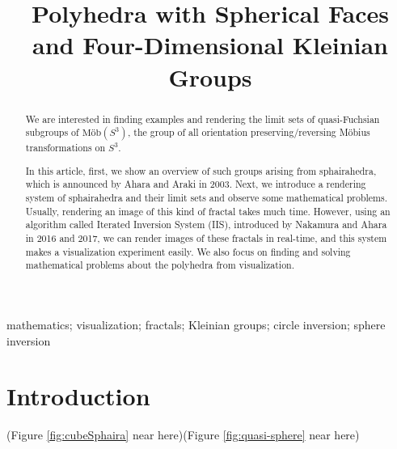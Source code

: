 \documentclass[suppldata, dvipdfmx]{interact}
\date{\empty}
\theoremstyle{plain}%
\theoremstyle{definition}
\theoremstyle{remark}
\theoremstyle{problemstyle}
\begin{document}

\title{Polyhedra with Spherical Faces and Four-Dimensional Kleinian Groups}

\author{
}

\maketitle

\begin{abstract}
We are interested in finding examples and rendering the limit sets of
quasi-Fuchsian subgroups of $\text{M\"ob}(S^3)$, the group of all
orientation preserving/reversing M\"obius transformations on $S^3$. 

In this article, first, we show an overview of such groups arising from
sphairahedra, which is announced by Ahara and Araki in 2003.
Next, we introduce a rendering system of sphairahedra and their limit
sets and observe some mathematical problems. 
Usually, rendering an image of this kind of fractal takes much time.
However, using an algorithm called Iterated Inversion System (IIS),
introduced by Nakamura and Ahara in 2016 and 2017,
we can render images of these fractals in real-time, and this system
makes a visualization experiment easily. We also focus on finding and
solving mathematical problems about the polyhedra from visualization.

\end{abstract}

\begin{keywords}
mathematics; visualization; fractals; Kleinian groups; circle inversion;
 sphere inversion
\end{keywords}


\section{Introduction}

(Figure \ref{fig:cubeSphaira} near here)(Figure
\ref{fig:quasi-sphere}
near here)
\end{document}
